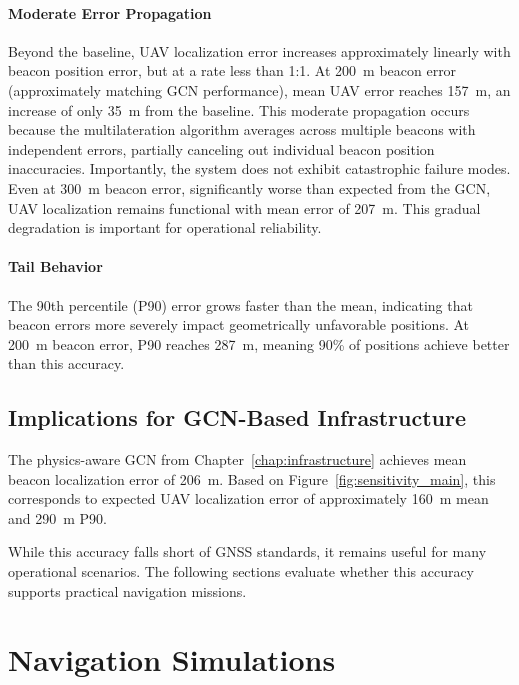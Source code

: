\documentclass[master,final,11pt]{iscs-thesis}
\begin{document}
\paragraph{Moderate Error Propagation}
Beyond the baseline, UAV localization error increases approximately linearly with beacon position error, but at a rate less than 1:1.
At 200~m beacon error (approximately matching GCN performance), mean UAV error reaches 157~m, an increase of only 35~m from the baseline.
This moderate propagation occurs because the multilateration algorithm averages across multiple beacons with independent errors, partially canceling out individual beacon position inaccuracies.
Importantly, the system does not exhibit catastrophic failure modes.
Even at 300~m beacon error, significantly worse than expected from the GCN, UAV localization remains functional with mean error of 207~m.
This gradual degradation is important for operational reliability.

\paragraph{Tail Behavior}
The 90th percentile (P90) error grows faster than the mean, indicating that beacon errors more severely impact geometrically unfavorable positions.
At 200~m beacon error, P90 reaches 287~m, meaning 90\% of positions achieve better than this accuracy.

\subsection{Implications for GCN-Based Infrastructure}

The physics-aware GCN from Chapter~\ref{chap:infrastructure} achieves mean beacon localization error of 206~m.
Based on Figure~\ref{fig:sensitivity_main}, this corresponds to expected UAV localization error of approximately 160~m mean and 290~m P90.

While this accuracy falls short of GNSS standards, it remains useful for many operational scenarios.
The following sections evaluate whether this accuracy supports practical navigation missions.

\section{Navigation Simulations}
\label{sec:nav_simulations}
\end{document}
